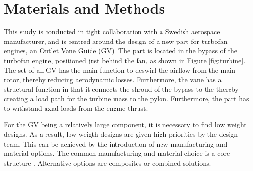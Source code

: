 \documentclass[aerospace,article,submit,moreauthors,pdftex]{Definitions/mdpi}
\newcommand{\revision}[1]{\color{black}{#1 }\color{black}}
\begin{document}





\section{Materials and Methods}\label{sec:method}
This study is conducted in tight collaboration with a Swedish aerospace manufacturer, and is centred around the design of a new part for turbofan engines, an Outlet Vane Guide (\ac{GV}).
The part is located in the bypass of the turbofan engine, positioned just behind the fan, as shown in Figure \ref{fig:turbine}.
The set of all \ac{GV} has the main function to deswirl the airflow from the main rotor, thereby reducing aerodynamic losses.
Furthermore, the vane has a structural function in that it connects the shroud of the bypass to the \revision{engine core,} thereby creating a load path for the turbine mass to the pylon.
Furthermore, the part has to withstand axial loads from the engine thrust.

For the \ac{GV} being a relatively large component, it is necessary to find low weight designs.
As a result, low-weigth designs are given high priorities by the design team.
This can be achieved  by the introduction of new manufacturing and material options.
The common manufacturing and material choice is a \revision{metallic}  core structure \cite{Sjunnesson2019}.
Alternative options are composites or combined solutions.
\end{document}
